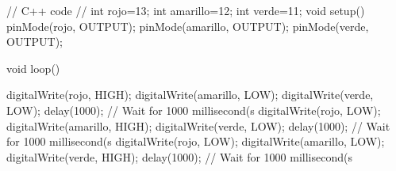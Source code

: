 // C++ code
//
int rojo=13;
int amarillo=12;
int verde=11;
void setup()
{
  pinMode(rojo, OUTPUT);
  pinMode(amarillo, OUTPUT);
  pinMode(verde, OUTPUT);
}

void loop()
{
  digitalWrite(rojo, HIGH);
  digitalWrite(amarillo, LOW);
  digitalWrite(verde, LOW);
  delay(1000); // Wait for 1000 millisecond(s
  digitalWrite(rojo, LOW);
  digitalWrite(amarillo, HIGH);
  digitalWrite(verde, LOW);
  delay(1000); // Wait for 1000 millisecond(s
  digitalWrite(rojo, LOW);
  digitalWrite(amarillo, LOW);
  digitalWrite(verde, HIGH);
  delay(1000); // Wait for 1000 millisecond(s

}